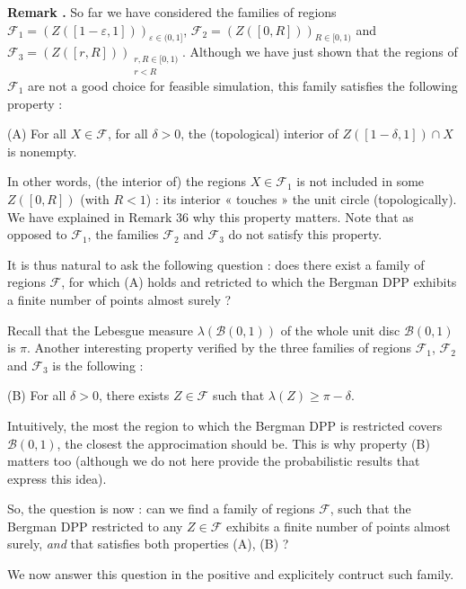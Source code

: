 \documentclass[11pt]{article}
\newcounter{cnt}
\newcommand{\cnt}{\thecnt \stepcounter{cnt}}
\begin{document}
\textbf{Remark \cnt.} So far we have considered the families of regions $ \mathcal F_1 = (Z([1-\varepsilon, 1]))_{\varepsilon \in (0,1]} $, $ \mathcal F_2 = (Z([0,R]))_{R \in [0,1)} $ and $ \mathcal F_3 = (Z([r,R]))_{\substack{r,R \in [0,1) \\ r < R }} $. Although we have just shown that the regions of $ \mathcal F_1 $ are not a good choice for feasible simulation, this family satisfies the following property :

\begin{center} 
    (A) For all $ X \in \mathcal F$, for all $ \delta > 0 $, the (topological) interior of $Z([1-\delta, 1]) \cap X$ is nonempty.
\end{center}

In other words, (the interior of) the regions $X \in \mathcal F_1$ is not included in some $ Z([0,R]) $ (with $ R < 1 $) : its interior « touches » the unit circle (topologically). We have explained in Remark 36 why this property matters. Note that as opposed to $\mathcal F_1$, the families $\mathcal F_2$ and $\mathcal F_3$ do not satisfy this property.

It is thus natural to ask the following question : does there exist a family of regions $ \mathcal F $, for which (A) holds and retricted to which the Bergman DPP exhibits a finite number of points almost surely ?

Recall that the Lebesgue measure $ \lambda(\mathcal B(0,1)) $ of the whole unit disc $ \mathcal B(0,1)$ is $ \pi $. Another interesting property verified by the three families of regions $ \mathcal F_1 $, $ \mathcal F_2 $ and $ \mathcal F_3 $ is the following :

(B) For all $ \delta > 0 $, there exists $ Z \in \mathcal F $ such that $ \lambda (Z) \geqslant \pi - \delta $.

Intuitively, the most the region to which the Bergman DPP is restricted covers $ \mathcal B(0,1) $, the closest the approcimation should be. This is why property (B) matters too (although we do not here provide the probabilistic results that express this idea). 

So, the question is now : can we find a family of regions $ \mathcal F $, such that the Bergman DPP restricted to any $ Z \in \mathcal F $ exhibits a finite number of points almost surely, \textit{and} that satisfies both properties (A), (B) ?

We now answer this question in the positive and explicitely contruct such family.
\end{document}
